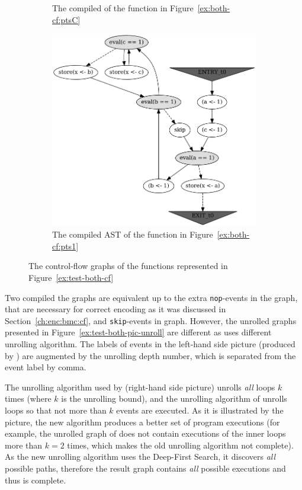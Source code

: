 \begin{figure}[!h]
\begin{subfigure}[t]{.49\textwidth}
  \caption{The compiled \xgraph{} of the function in Figure~\ref{ex:both-cf:ptsC}}
  \label{ex:both-cf:graph:ptsC}
\end{subfigure}
%
\begin{subfigure}[t]{.49\textwidth}\centering
  \includegraphics[width=\textwidth,keepaspectratio]{img/my/graphs/unrolling-comparison/Porthos/t0.png}
  \hfill
  \caption{The compiled AST of the function in Figure~\ref{ex:both-cf:pts1}}
  \label{ex:both-cf:graph:pts1}
\end{subfigure}
%
\caption{The control-flow graphs of the functions represented in Figure~\ref{ex:test-both-cf}}
\label{ex:test-both-pic}
\end{figure}

Two compiled the graphs are equivalent up to the extra \texttt{nop}-events in the \porthos[2] graph, that are necessary for correct encoding as it was discussed in Section~\ref{ch:enc:bmc:cf}, and \texttt{skip}-events in \porthos[1] graph.
However, the unrolled graphs presented in Figure~\ref{ex:test-both-pic-unroll} are different as \porthos[2] uses different unrolling algorithm.
The labels of events in the left-hand side picture (produced by \porthos[2]) are augmented by the unrolling depth number, which is separated from the event label by comma.

The unrolling algorithm used by \porthos[1] (right-hand side picture) unrolls \textit{all} loops $k$ times (where $k$ is the unrolling bound), and the unrolling algorithm of \porthos[2] unrolls loops so that not more than $k$ events are executed.
As it is illustrated by the picture, the new algorithm produces a better set of program executions (for example, the unrolled graph of \porthos[1] does not contain executions of the inner loops more than $k=2$ times, which makes the old unrolling algorithm not complete).
As the new unrolling algorithm uses the Deep-First Search, it discovers \textit{all} possible paths, therefore the result graph contains \textit{all} possible executions and thus is complete.


